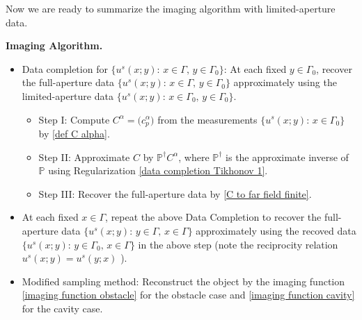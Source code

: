 \documentclass[final]{siamltex}
\newtheorem{algorithm}{Data Completion Algorithm}%
\begin{document}
%
Now we are ready to summarize the imaging algorithm with limited-aperture data.

\medskip

\noindent\textbf{Imaging Algorithm.}
\
\begin{itemize}
\item Data completion for $\{u^s(x;y): \, x\in \Gamma,\, y\in\Gamma_0\}$:  At each fixed $y\in\Gamma_0$, recover the full-aperture data $\{u^s(x;y): \, x\in \Gamma,\, y\in\Gamma_0\}$ approximately  using the limited-aperture data $\{u^s(x;y): \, x\in \Gamma_0, \,y\in \Gamma_0\}$.
\begin{itemize}
\item Step I: Compute $C^{\alpha}=\Big(c_{p}^{\alpha}\Big)$ from the measurements $\{u^s(x;y): \, x\in \Gamma_0\}$ by \eqref{def C alpha}.
\item Step II: Approximate $C$ by $ \mathbb{P}^{\dagger} C^\alpha $, where $\mathbb{P}^\dagger$ is the approximate inverse of $\mathbb{P}$ using
Regularization \eqref{data completion Tikhonov 1}.
\item Step III: Recover the full-aperture data by \eqref{C to far field finite}.
\end{itemize}
\item At each fixed $x\in\Gamma$, repeat the above Data Completion to recover the full-aperture data $\{u^s(x;y): \, y\in \Gamma,\, x\in\Gamma\}$ approximately  using the recoved data $\{u^s(x;y): \, y\in \Gamma_0, \,x\in \Gamma\}$ in the above step (note the reciprocity relation $u^s(x;y)=u^s(y;x)$ \cite{CK}).
\item Modified sampling method: Reconstruct the object by the imaging function  \eqref{imaging function obstacle} for the obstacle case and \eqref{imaging function cavity} for the cavity case.
\end{itemize}
\end{document}
